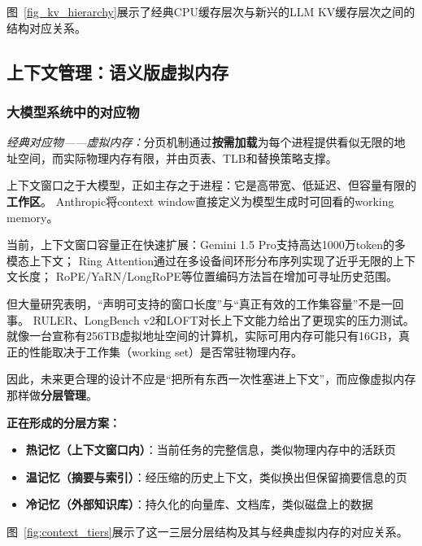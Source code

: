 图~\ref{fig_kv_hierarchy}展示了经典CPU缓存层次与新兴的LLM KV缓存层次之间的结构对应关系。


\subsection{上下文管理：语义版虚拟内存}
\label{sec:memory}

\subsubsection{大模型系统中的对应物}

\textit{经典对应物——虚拟内存：}分页机制通过\textbf{按需加载}为每个进程提供看似无限的地址空间，而实际物理内存有限，并由页表、TLB和替换策略支撑\cite{ostep_2023}。

上下文窗口之于大模型，正如主存之于进程：它是高带宽、低延迟、但容量有限的\textbf{工作区}。
Anthropic将context window直接定义为模型生成时可回看的working memory。

当前，上下文窗口容量正在快速扩展：Gemini 1.5 Pro支持高达1000万token的多模态上下文\cite{gemini2024}；
Ring Attention通过在多设备间环形分布序列实现了近乎无限的上下文长度\cite{liu2024ringattention}；
RoPE/YaRN/LongRoPE等位置编码方法旨在增加可寻址历史范围\cite{su2021roformer,yarn2024,longrope2024}。

但大量研究表明，``声明可支持的窗口长度''与``真正有效的工作集容量''不是一回事。
RULER、LongBench v2和LOFT对长上下文能力给出了更现实的压力测试\cite{ruler2024,longbenchv2_2024,loft2024}。
就像一台宣称有256TB虚拟地址空间的计算机，实际可用内存可能只有16GB，真正的性能取决于工作集（working set）是否常驻物理内存。

因此，未来更合理的设计不应是``把所有东西一次性塞进上下文''，而应像虚拟内存那样做\textbf{分层管理}。

\textbf{正在形成的分层方案：}
\begin{itemize}[nosep]
\item \textbf{热记忆（上下文窗口内）}：当前任务的完整信息，类似物理内存中的活跃页
\item \textbf{温记忆（摘要与索引）}：经压缩的历史上下文，类似换出但保留摘要信息的页
\item \textbf{冷记忆（外部知识库）}：持久化的向量库、文档库，类似磁盘上的数据
\end{itemize}

图~\ref{fig:context_tiers}展示了这一三层分层结构及其与经典虚拟内存的对应关系。


